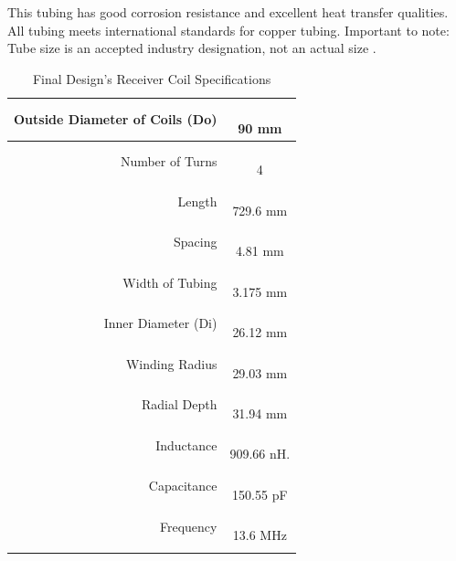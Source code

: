 \documentclass[12pt]{article}
\begin{document}
\indent
This tubing has good corrosion resistance and excellent heat transfer qualities. All tubing meets international standards for copper tubing. Important to note: Tube size is an accepted industry designation, not an actual size  \cite{rfCond}.

\begin{table}[h!]
\centering
\caption{Final Design's Receiver Coil Specifications}
\begin{tabular} {| r | c | }
\hline
\parbox{0.3\linewidth}{\raggedleft
Outside Diameter of Coils (Do) 
} &   \parbox{0.45\linewidth}{\hfill \\
90 mm
}\\
\hline
\parbox{0.3\linewidth}{\raggedleft
 Number of Turns 
} &   \parbox{0.45\linewidth}{\hfill \\
4
}\\
\hline
\parbox{0.3\linewidth}{\raggedleft
Length
} &   \parbox{0.45\linewidth}{\hfill \\
729.6 mm
}\\
\hline
\parbox{0.3\linewidth}{\raggedleft
Spacing
} &   \parbox{0.45\linewidth}{\hfill \\
4.81 mm
}\\
\hline
\parbox{0.3\linewidth}{\raggedleft
Width of Tubing
} &   \parbox{0.45\linewidth}{\hfill \\
3.175 mm
}\\
\hline
\parbox{0.3\linewidth}{\raggedleft
Inner Diameter (Di) 
} &   \parbox{0.45\linewidth}{\hfill \\
26.12 mm
}\\
\hline
\parbox{0.3\linewidth}{\raggedleft
Winding Radius 
} &   \parbox{0.45\linewidth}{\hfill \\
29.03 mm
}\\
\hline
\parbox{0.3\linewidth}{\raggedleft
Radial Depth 
} &   \parbox{0.45\linewidth}{\hfill \\
31.94 mm
}\\
\hline
\parbox{0.3\linewidth}{\raggedleft
Inductance
} &   \parbox{0.45\linewidth}{\hfill \\
909.66 nH.
}\\
\hline
\parbox{0.3\linewidth}{\raggedleft
Capacitance
} &   \parbox{0.45\linewidth}{\hfill \\
150.55 pF
}\\
\hline
\parbox{0.3\linewidth}{\raggedleft
Frequency
} &   \parbox{0.45\linewidth}{\hfill \\
13.6 MHz
}\\
\hline
\parbox{0.3\linewidth}{\raggedleft
}
\end{tabular}
\end{table}
\end{document}
